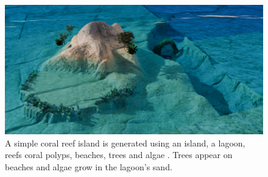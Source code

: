 \begin{figure}[H]
    \includegraphics{multiScene1 v2 final 1.png}
    \caption{A simple coral reef island is generated using an island, a lagoon, reefs coral polyps, beaches, trees and algae . Trees appear on beaches and algae grow in the lagoon's sand. }
    \label{fig:env-obj_coral-island-scene}
\end{figure}





































